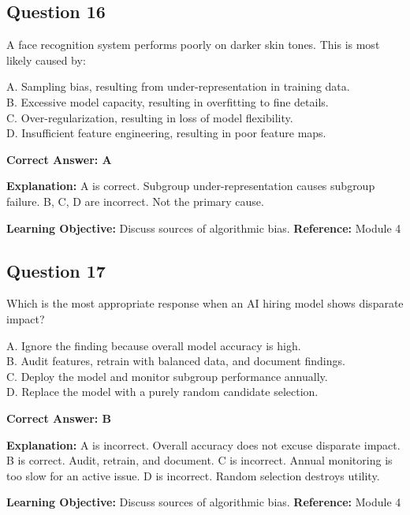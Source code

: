 \documentclass[11pt]{article}
\begin{document}
	\subsection*{Question 16}
	A face recognition system performs poorly on darker skin tones. This is
	most likely caused by:
	
	A. Sampling bias, resulting from under-representation in training data.\\
	B. Excessive model capacity, resulting in overfitting to fine details.\\
	C. Over-regularization, resulting in loss of model flexibility.\\
	D. Insufficient feature engineering, resulting in poor feature maps.
	
	\vspace{0.4em}
	\textbf{Correct Answer: A}
	
	\textbf{Explanation:}
	A is correct. Subgroup under-representation causes subgroup failure.
	B, C, D are incorrect. Not the primary cause.
	
	\textbf{Learning Objective:} Discuss sources of algorithmic bias.
	\textbf{Reference:} Module 4
	
	\subsection*{Question 17}
	Which is the most appropriate response when an AI hiring model shows
	disparate impact?
	
	A. Ignore the finding because overall model accuracy is high.\\
	B. Audit features, retrain with balanced data, and document findings.\\
	C. Deploy the model and monitor subgroup performance annually.\\
	D. Replace the model with a purely random candidate selection.
	
	\vspace{0.4em}
	\textbf{Correct Answer: B}
	
	\textbf{Explanation:}
	A is incorrect. Overall accuracy does not excuse disparate impact.
	B is correct. Audit, retrain, and document.
	C is incorrect. Annual monitoring is too slow for an active issue.
	D is incorrect. Random selection destroys utility.
	
	\textbf{Learning Objective:} Discuss sources of algorithmic bias.
	\textbf{Reference:} Module 4
	
\end{document}
